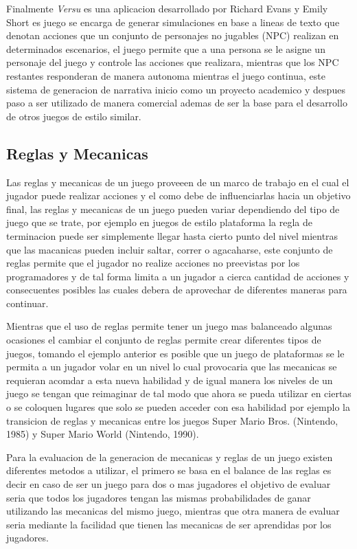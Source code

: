 Finalmente \textit{Versu} es una aplicacion desarrollado por Richard Evans y
Emily Short \cite{evans2013versu} es juego se encarga de generar simulaciones en
base a lineas de texto que denotan acciones que un conjunto de personajes no
jugables (NPC) realizan en determinados escenarios, el juego permite que a una
persona se le asigne un personaje del juego y controle las acciones que
realizara, mientras que los NPC restantes responderan de manera autonoma
mientras el juego continua, este sistema de generacion de narrativa inicio como
un proyecto academico y despues paso a ser utilizado de manera comercial ademas
de ser la base para el desarrollo de otros juegos de estilo similar.

\subsection{Reglas y Mecanicas}
\label{subsection:rulesandmechanics}

Las reglas y mecanicas de un juego proveeen de un marco de trabajo en el cual el
jugador puede realizar acciones y el como debe de influenciarlas hacia un
objetivo final, las reglas y mecanicas de un juego pueden variar dependiendo del
tipo de juego que se trate, por ejemplo en juegos de estilo plataforma la regla
de terminacion puede ser simplemente llegar hasta cierto punto del nivel
mientras que las macanicas pueden incluir saltar, correr o agacaharse, este
conjunto de reglas permite que el jugador no realize acciones no preevistas por
los programadores y de tal forma limita a un jugador a cierca cantidad de
acciones y consecuentes posibles las cuales debera de aprovechar de diferentes
maneras para continuar.

Mientras que el uso de reglas permite tener un juego mas balanceado algunas
ocasiones el cambiar el conjunto de reglas permite crear diferentes tipos de
juegos, tomando el ejemplo anterior es posible que un juego de plataformas se le
permita a un jugador volar en un nivel lo cual provocaria que las mecanicas se
requieran acomdar a esta nueva habilidad y de igual manera los niveles de un
juego se tengan que reimaginar de tal modo que ahora se pueda utilizar en
ciertas o se coloquen lugares que solo se pueden acceder con esa habilidad por
ejemplo la transicion de reglas y mecanicas entre los juegos Super Mario Bros.
(Nintendo, 1985) y Super Mario World (Nintendo, 1990).

Para la evaluacion de la generacion de mecanicas y reglas de un juego existen
diferentes metodos a utilizar, el primero se basa en el balance de las reglas es
decir en caso de ser un juego para dos o mas jugadores el objetivo de evaluar
seria que todos los jugadores tengan las mismas probabilidades de ganar
utilizando las mecanicas del mismo juego, mientras que otra manera de evaluar
seria mediante la facilidad que tienen las mecanicas de ser aprendidas por los
jugadores.

